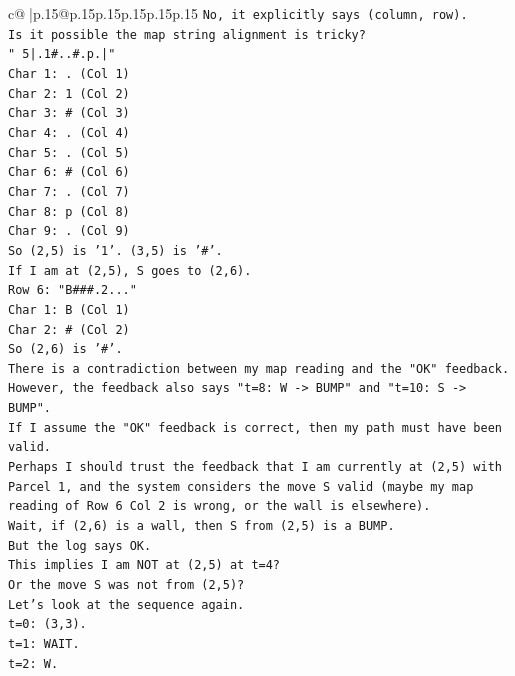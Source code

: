 \documentclass{article}
\begin{document}
{\begin{supertabular}{c@{$\;$}|p{.15\linewidth}@{}p{.15\linewidth}p{.15\linewidth}p{.15\linewidth}p{.15\linewidth}p{.15\linewidth}}
{{{\texttt{No, it explicitly says (column, row).} \\
\texttt{Is it possible the map string alignment is tricky?} \\
\texttt{" 5|.1\#..\#.p.|"} \\
\texttt{Char 1: . (Col 1)} \\
\texttt{Char 2: 1 (Col 2)} \\
\texttt{Char 3: \# (Col 3)} \\
\texttt{Char 4: . (Col 4)} \\
\texttt{Char 5: . (Col 5)} \\
\texttt{Char 6: \# (Col 6)} \\
\texttt{Char 7: . (Col 7)} \\
\texttt{Char 8: p (Col 8)} \\
\texttt{Char 9: . (Col 9)} \\
\texttt{So (2,5) is '1'. (3,5) is '\#'.} \\
\texttt{If I am at (2,5), S goes to (2,6).} \\
\texttt{Row 6: "B\#\#\#.2..."} \\
\texttt{Char 1: B (Col 1)} \\
\texttt{Char 2: \# (Col 2)} \\
\texttt{So (2,6) is '\#'.} \\
\texttt{There is a contradiction between my map reading and the "OK" feedback.} \\
\texttt{However, the feedback also says "t=8: W {-}> BUMP" and "t=10: S {-}> BUMP".} \\
\texttt{If I assume the "OK" feedback is correct, then my path must have been valid.} \\
\texttt{Perhaps I should trust the feedback that I am currently at (2,5) with Parcel 1, and the system considers the move S valid (maybe my map reading of Row 6 Col 2 is wrong, or the wall is elsewhere).} \\
\texttt{Wait, if (2,6) is a wall, then S from (2,5) is a BUMP.} \\
\texttt{But the log says OK.} \\
\texttt{This implies I am NOT at (2,5) at t=4?} \\
\texttt{Or the move S was not from (2,5)?} \\
\texttt{Let's look at the sequence again.} \\
\texttt{t=0: (3,3).} \\
\texttt{t=1: WAIT.} \\
\texttt{t=2: W.} \\
}}}
\end{supertabular}}
\end{document}
